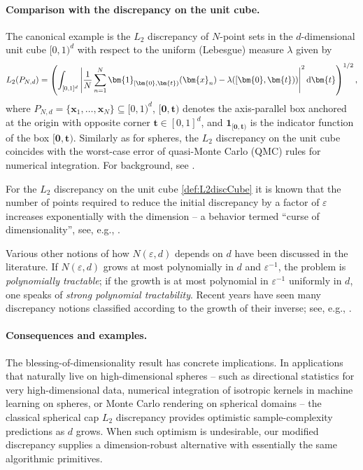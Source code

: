 \documentclass[12pt]{article}
\begin{document}
\paragraph{Comparison with the discrepancy on the unit cube.}

The canonical example is the $L_2$ discrepancy of $N$-point sets in the $d$-dimensional unit cube $[0,1)^d$ with respect to the uniform (Lebesgue) measure $\lambda$ given by
\begin{equation}\label{def:L2discCube}
L_2(P_{N,d})=\left(\int_{[0,1]^d} \left| \frac{1}{N} \sum_{n=1}^N \bm{1}_{[\bm{0}, \bm{t})}(\bm{x}_n) - \lambda([\bm{0}, \bm{t})) \right|^2 {\rm d} \bm{t}\right)^{1/2},
\end{equation}
where $P_{N,d}=\{\bm{x}_1,\ldots,\bm{x}_N\} \subseteq [0,1)^d$, $[\bm{0},\bm{t})$ denotes the axis-parallel box anchored at the origin with opposite corner $\bm{t}\in[0,1]^d$, and $\bm{1}_{[\bm{0},\bm{t})}$ is the indicator function of the box $[\bm{0},\bm{t})$. Similarly as for spheres, the $L_2$ discrepancy on the unit cube coincides with the worst-case error of quasi-Monte Carlo (QMC) rules for numerical integration. For background, see \cite[Chapter~9]{NW10}.

For the $L_2$ discrepancy on the unit cube \eqref{def:L2discCube} it is known that the number of points required to reduce the initial discrepancy by a factor of $\varepsilon$ increases exponentially with the dimension -- a behavior termed ``curse of dimensionality'', see, e.g., \cite{NP25b,NW10,Wo99}. 

Various other notions of how $N(\varepsilon,d)$ depends on $d$ have been discussed in the literature. If $N(\varepsilon, d)$ grows at most polynomially in $d$ and $\varepsilon^{-1}$, the problem is \emph{polynomially tractable}; if the growth is at most polynomial in $\varepsilon^{-1}$ uniformly in $d$, one speaks of \emph{strong polynomial tractability}. Recent years have seen many discrepancy notions classified according to the growth of their inverse; see, e.g., \cite{NP25a,NW08,NW10}.




\paragraph{Consequences and examples.}
The blessing-of-dimensionality result has concrete implications. In applications that naturally live on high-dimensional spheres -- such as directional statistics for very high-dimensional data, numerical integration of isotropic kernels in machine learning on spheres, or Monte Carlo rendering on spherical domains -- the classical spherical cap $L_2$ discrepancy provides optimistic sample-complexity predictions as $d$ grows. When such optimism is undesirable, our modified discrepancy supplies a dimension-robust alternative with essentially the same algorithmic primitives.
\end{document}
